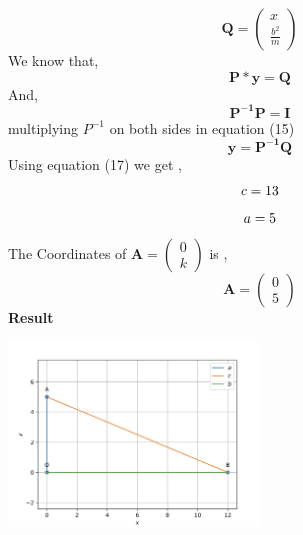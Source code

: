 \documentclass[10pt,a4paper]{report}
\let\vec\mathbf
\begin{document}
\begin{multicols}{2}
\begin{equation}
 \vec{Q} = \begin{pmatrix}
x\\
\frac{b^2}{m}
\end{pmatrix} 
\end{equation}\vspace{2mm}
We know that,\\
\begin{equation}
\vec{P * y = Q}
\end{equation}
And,\\
\begin{equation}
\vec{P^{-1} P = I}
\end{equation}
multiplying $P^{-1}$ on both sides in equation (15)\\
\begin{equation}
 \vec{y = P^{-1} Q}
\end{equation}
Using equation (17) we get ,
\begin{equation}
c = 13 \vspace{2mm}
\end{equation}
\begin{equation}
 a = 5 \vspace{2mm}
\end{equation}
The Coordinates of $\vec{A}=\begin{pmatrix}
0\\
k
\end{pmatrix}$  is ,\\
\begin{equation}
 \vec{A}=\begin{pmatrix}
0 \\
5
\end{pmatrix} 
\end{equation}
\textbf{Result} 
\begin{center}
 \includegraphics[width=0.5\textwidth]{matrix.jpg}  
 \end{center}\vspace{5mm}
 \vspace{2mm}  

\end{multicols}
\end{document}
